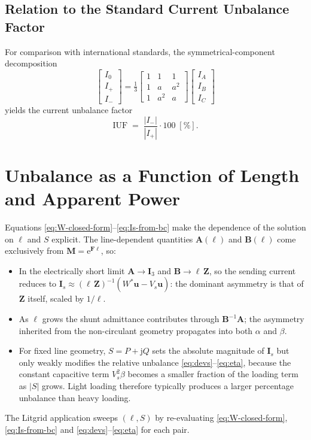 \documentclass[11pt,a4paper]{article}
\newcommand{\jj}{\mathrm{j}}
\newcommand{\ee}{\mathrm{e}}
\newcommand{\matZ}{\bm{Z}}
\newcommand{\matA}{\bm{A}}
\newcommand{\matB}{\bm{B}}
\newcommand{\matM}{\bm{M}}
\newcommand{\matF}{\bm{F}}
\newcommand{\matI}{\bm{I}}
\newcommand{\vI}{\bm{I}}
\newcommand{\vu}{\bm{u}}
\begin{document}
\subsection{Relation to the Standard Current Unbalance Factor}

For comparison with international standards, the symmetrical-component decomposition
\begin{equation}
\begin{bmatrix}I_{0}\\I_{+}\\I_{-}\end{bmatrix}=\tfrac{1}{3}
\begin{bmatrix}1&1&1\\1&a&a^{2}\\1&a^{2}&a\end{bmatrix}
\begin{bmatrix}I_{A}\\I_{B}\\I_{C}\end{bmatrix}
\end{equation}
yields the current unbalance factor
\begin{equation}
\mathrm{IUF}\;=\;\frac{|I_{-}|}{|I_{+}|}\cdot 100\;[\%].
\label{eq:IUF}
\end{equation}

\section{Unbalance as a Function of Length and Apparent Power}

Equations \eqref{eq:W-closed-form}--\eqref{eq:Is-from-bc} make the dependence
of the solution on \(\ell\) and \(S\) explicit. The line-dependent quantities
\(\matA(\ell)\) and \(\matB(\ell)\) come exclusively from
\(\matM=\ee^{\matF\ell}\), so:
\begin{itemize}
\item In the electrically short limit \(\matA\to\matI_{3}\) and
\(\matB\to\ell\,\matZ\), so the sending current reduces to
\(\vI_{s}\approx(\ell\,\matZ)^{-1}(W^{*}\vu - V_{s}\vu)\): the dominant
asymmetry is that of \(\matZ\) itself, scaled by \(1/\ell\).
\item As \(\ell\) grows the shunt admittance contributes through
\(\matB^{-1}\matA\); the asymmetry inherited from the non-circulant geometry
propagates into both \(\alpha\) and \(\beta\).
\item For fixed line geometry, \(S=P+\jj Q\) sets the absolute magnitude of
\(\vI_{s}\) but only weakly modifies the relative unbalance
\eqref{eq:devs}--\eqref{eq:eta}, because the constant capacitive term
\(V_{s}^{2}\beta\) becomes a smaller fraction of the loading term as \(|S|\)
grows. Light loading therefore typically produces a larger percentage
unbalance than heavy loading.
\end{itemize}
The Litgrid application sweeps \((\ell,S)\) by re-evaluating
\eqref{eq:W-closed-form}, \eqref{eq:Is-from-bc} and
\eqref{eq:devs}--\eqref{eq:eta} for each pair.
\end{document}
